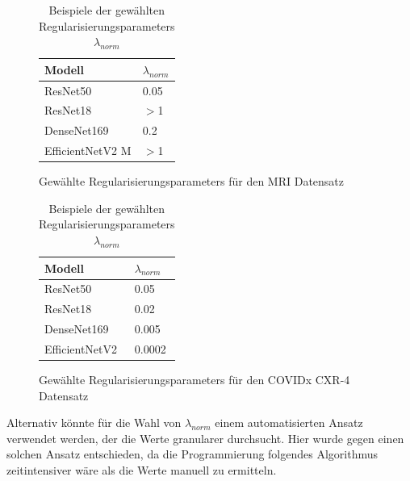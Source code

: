 \begin{table}[h!]
    \centering
    \begin{subfigure}{0.45\linewidth}
        \centering
        \begin{tabular}{l|l}
            \hline
            \textbf{Modell} & \textbf{$\lambda_{norm}$} \\ 
            \hline
            ResNet50 & 0.05 \\
            \hline
            ResNet18 & $>$1 \\
            \hline
            DenseNet169 & 0.2 \\
            \hline
            EfficientNetV2 M & $>$1\\
        \end{tabular}
        \caption{Gewählte Regularisierungsparameters für den MRI Datensatz}
        \label{tab:BrainTumor}
    \end{subfigure}%
    \hspace{0.05\linewidth} %
    \begin{subfigure}{0.45\linewidth}
        \centering
        \begin{tabular}{l|l}
            \hline
            \textbf{Modell} & \textbf{$\lambda_{norm}$} \\ 
            \hline
            ResNet50 & 0.05 \\
            \hline
            ResNet18 & 0.02 \\
            \hline
            DenseNet169 & 0.005 \\
            \hline
            EfficientNetV2 & 0.0002\\
        \end{tabular}
        \caption{Gewählte Regularisierungsparameters für den COVIDx CXR-4 Datensatz}
        \label{tab:COVIDxCXR4}
    \end{subfigure}
    \caption{Beispiele der gewählten Regularisierungsparameters $\lambda_{norm}$}
    \label{tab:Regularisierungsparameters}
\end{table}


Alternativ könnte für die Wahl von $\lambda_{norm}$ einem automatisierten Ansatz verwendet werden, der die Werte granularer durchsucht. Hier wurde gegen einen solchen Ansatz entschieden, da die Programmierung folgendes Algorithmus zeitintensiver wäre als die Werte manuell zu ermitteln.